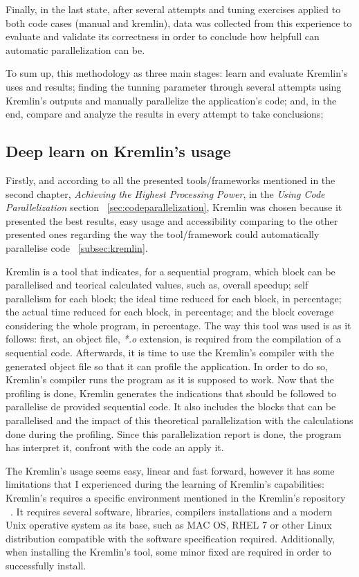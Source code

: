Finally, in the last state, after several attempts and tuning exercises applied to both code cases (manual and kremlin), data was collected from this experience to evaluate and validate its correctness in order to conclude how helpfull can automatic parallelization can be.

To sum up, this methodology as three main stages: learn and evaluate  Kremlin's uses and results; finding the tunning parameter through several attempts using Kremlin's outputs and manually parallelize the application's code; and, in the end, compare and analyze the results in every attempt to take conclusions; 


\subsection{Deep learn on Kremlin's usage}

Firstly, and according to all the presented tools/frameworks mentioned in the second chapter, \textit{Achieving the Highest Processing Power}, in the \textit{Using Code Parallelization} section ~\ref{sec:codeparallelization}, Kremlin was chosen because it presented the best results, easy usage and accessibility comparing to the other presented ones regarding the way the tool/framework could automatically parallelise code ~\ref{subsec:kremlin}.

Kremlin is a tool that indicates, for a sequential program, which block can be parallelised and teorical calculated values, such as, overall speedup; self parallelism for each block; the ideal time reduced for each block, in percentage; the actual time reduced for each block, in percentage; and the block coverage considering the whole program, in percentage. The way this tool was used is as it follows: first, an object file, \textit{*.o} extension, is required from the compilation of a sequential code. Afterwards, it is time to use the Kremlin's compiler with the generated object file so that it can profile the application. In order to do so, Kremlin's compiler runs the program as it is supposed to work. Now that the profiling is done, Kremlin generates the indications that should be followed to parallelise de provided sequential code. It also includes the blocks that can be parallelised and the impact of this theoretical parallelization with the calculations done during the profiling. Since this parallelization report is done, the program has interpret it, confront with the code an apply it.

The Kremlin's usage seems easy, linear and fast forward, however it has some limitations that I experienced during the learning of Kremlin's capabilities: Kremlin's requires a specific environment mentioned in the Kremlin's repository ~\cite{KremlinRep}. It requires several software, libraries, compilers installations and a modern Unix operative system as its base, such as MAC OS, RHEL 7 or other Linux distribution compatible with the software specification required. Additionally, when installing the Kremlin's tool, some minor fixed are required in order to successfully install.

